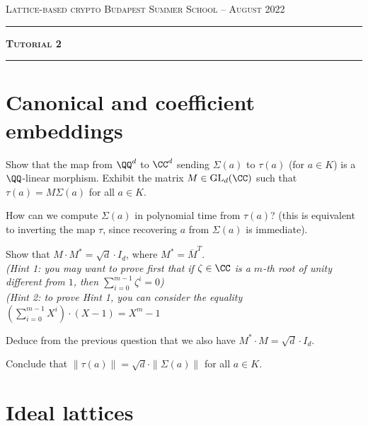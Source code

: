 \documentclass[11pt]{exam}
\theoremstyle{definition}
\begin{document}
{\noindent
   \textsc{Lattice-based crypto}
   \hfill {\textsc{Budapest Summer School -- August 2022}}\\
  }
  \hrule
  \begin{center}
    {\Large\textbf{
   \textsc{Tutorial 2}
    } } 
  \end{center}
  \hrule \vspace{5mm}

\thispagestyle{empty}

\vspace{0.2cm}


\section{Canonical and coefficient embeddings}

\begin{questions}
\question Show that the map from $\QQ^d$ to $\CC^d$ sending $\Sigma(a)$ to $\tau(a)$ (for $a \in K$) is a $\QQ$-linear morphism. Exhibit the matrix $M \in \mathrm{GL}_d(\CC)$ such that $\tau(a) = M \Sigma(a)$ for all $a \in K$.

\question How can we compute $\Sigma(a)$ in polynomial time from $\tau(a)$? (this is equivalent to inverting the map $\tau$, since recovering $a$ from $\Sigma(a)$ is immediate).

\question Show that $M \cdot M^* = \sqrt{d} \cdot I_d$, where $M^* = \overline{M}^T$.\\
\textit{\color{gray}(Hint 1: you may want to prove first that if $\zeta \in \CC$ is a $m$-th root of unity different from $1$, then $\sum_{i = 0}^{m-1} \zeta^i = 0$)} \\
\textit{\color{gray}(Hint 2: to prove Hint 1, you can consider the equality $(\sum_{i = 0}^{m-1} X^i) \cdot (X-1) = X^m-1$}

\question Deduce from the previous question that we also have $M^* \cdot M = \sqrt{d} \cdot I_d$.

\question Conclude that $\|\tau(a)\| = \sqrt{d} \cdot \|\Sigma(a)\|$ for all $a \in K$.

\end{questions}

\section{Ideal lattices}

\end{document}

